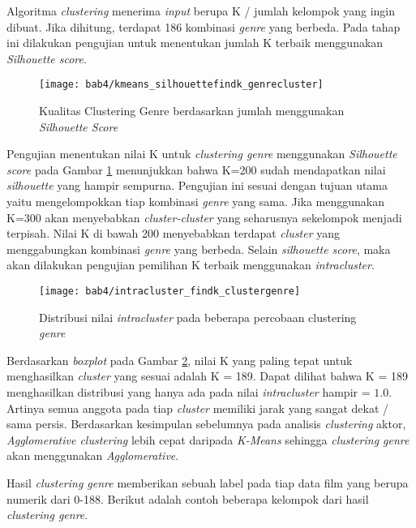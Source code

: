 Algoritma \textit{clustering} menerima \textit{input} berupa K / jumlah kelompok yang ingin dibuat. Jika dihitung, terdapat 186 kombinasi \textit{genre} yang berbeda. Pada tahap ini dilakukan pengujian untuk menentukan jumlah K terbaik menggunakan \textit{Silhouette score}. 

\begin{figure}[H]
	\centering  
	\texttt{[image: bab4/kmeans\_silhouettefindk\_genrecluster]}   
	\caption{Kualitas Clustering Genre berdasarkan jumlah menggunakan \textit{Silhouette Score} }	\label{fig:kmeans_silhouettefindk_genrecluster} 
\end{figure}

Pengujian menentukan nilai K untuk \textit{clustering genre} menggunakan \textit{Silhouette score} pada Gambar \ref{fig:kmeans_silhouettefindk_genrecluster} menunjukkan bahwa K=200 sudah mendapatkan nilai \textit{silhouette} yang hampir sempurna. Pengujian ini sesuai dengan tujuan utama yaitu mengelompokkan tiap kombinasi \textit{genre} yang sama. Jika menggunakan K=300 akan menyebabkan \textit{cluster-cluster} yang seharusnya sekelompok menjadi terpisah. Nilai K di bawah 200 menyebabkan terdapat \textit{cluster} yang menggabungkan kombinasi \textit{genre} yang berbeda. Selain \textit{silhouette score}, maka akan dilakukan pengujian pemilihan K terbaik menggunakan \textit{intracluster}. 



\begin{figure}[H]
	\centering  
	\texttt{[image: bab4/intracluster\_findk\_clustergenre]}   
	\caption{Distribusi nilai \textit{intracluster} pada beberapa percobaan clustering \textit{genre} }	\label{fig:intracluster_findk_clustergenre} 
\end{figure}


Berdasarkan \textit{boxplot} pada Gambar \ref{fig:intracluster_findk_clustergenre}, nilai K yang paling tepat untuk menghasilkan \textit{cluster} yang sesuai adalah K = 189. Dapat dilihat bahwa K = 189 menghasilkan distribusi yang hanya ada pada nilai  \textit{intracluster} hampir = $1.0$. Artinya semua anggota pada tiap \textit{cluster} memiliki jarak yang sangat dekat / sama persis. Berdasarkan kesimpulan sebelumnya pada analisis \textit{clustering} aktor, \textit{Agglomerative clustering} lebih cepat daripada \textit{K-Means} sehingga \textit{clustering genre} akan menggunakan \textit{Agglomerative}.

 Hasil \textit{clustering genre} memberikan sebuah label pada tiap data film yang berupa numerik dari 0-188. Berikut adalah contoh beberapa kelompok dari hasil \textit{clustering genre}. 


